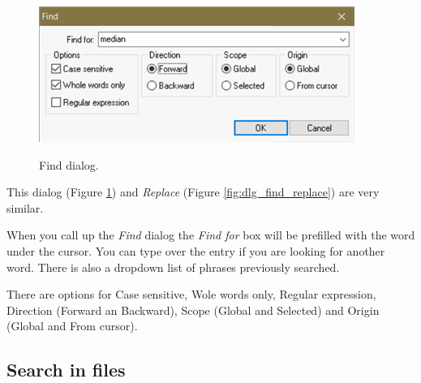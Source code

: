 \begin{figure}[H]
  \includegraphics[scale=0.50]{./res/dlg_find.png} \\
  \caption{Find dialog.}
  \label{fig:dlg_find}
\end{figure}
This dialog
(Figure \ref{fig:dlg_find})
and \textit{Replace}
(Figure \ref{fig:dlg_find_replace})
are very similar.

When you call up the \textit{Find} dialog the \textit{Find for} box will be
prefilled with the word under the cursor. You can type over the entry if you
are looking for another word. There is also a dropdown list of phrases
previously searched.

There are options for Case sensitive, Wole words only, Regular expression,
Direction (Forward an Backward), Scope (Global and Selected) and Origin (Global and From cursor).


\hypertarget{dlg_search_in_files}{}
\subsection{Search in files}

